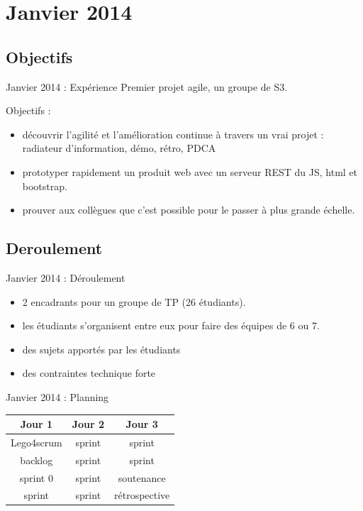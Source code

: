\documentclass{beamer}
\begin{document}
\section{Janvier 2014}
\subsection{Objectifs}
\begin{frame}{Janvier 2014 : Expérience}
  Premier projet agile, un groupe de S3.

  Objectifs : 
  \begin{itemize}
    \item découvrir l'agilité et l'amélioration continue à travers un vrai projet : radiateur d'information, démo, rétro, PDCA
    \item prototyper rapidement un produit web avec un serveur REST du JS, html et bootstrap.
    \item prouver aux collègues que c'est possible pour le passer à plus grande échelle. 
  \end{itemize}
\end{frame}

\subsection{Deroulement}
\begin{frame}{Janvier 2014 : Déroulement}
  \begin{itemize}
    \item 2 encadrants pour un groupe de TP (26 étudiants).
    \item les étudiants s'organisent entre eux pour faire des équipes de 6 ou 7.
    \item des sujets apportés par les étudiants
    \item des contraintes technique forte
  \end{itemize}
\end{frame}

\begin{frame}{Janvier 2014 : Planning}
  \begin{center}
    \begin{tabular}{| c | c | c |}
      \hline
      \textbf{Jour 1} & \textbf{Jour 2} & \textbf{Jour 3} \\
      \hline \hline
      Lego4scrum & sprint & sprint \\
      \hline
      backlog & sprint & sprint \\
      \hline \hline
      sprint 0 & sprint & soutenance \\
      \hline
      sprint & sprint & rétrospective \\
      \hline
    \end{tabular}
  \end{center}
\end{frame}
\end{document}
